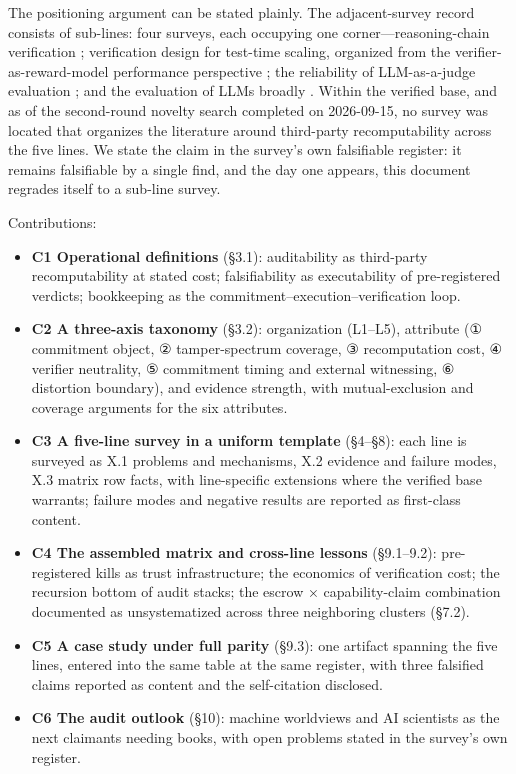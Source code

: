 \documentclass[11pt,a4paper]{article}
\begin{document}
The positioning argument can be stated plainly. The adjacent-survey record consists of sub-lines: four surveys, each occupying one corner—reasoning-chain verification \cite{key14}; verification design for test-time scaling, organized from the verifier-as-reward-model performance perspective \cite{key15}; the reliability of LLM-as-a-judge evaluation \cite{key16}; and the evaluation of LLMs broadly \cite{key17}. Within the verified base, and as of the second-round novelty search completed on 2026-09-15, no survey was located that organizes the literature around third-party recomputability across the five lines. We state the claim in the survey's own falsifiable register: it remains falsifiable by a single find, and the day one appears, this document regrades itself to a sub-line survey.

Contributions:

\begin{itemize}[leftmargin=1.6em]
\item \textbf{C1 Operational definitions} (§3.1): auditability as third-party recomputability at stated cost; falsifiability as executability of pre-registered verdicts; bookkeeping as the commitment–execution–verification loop.
\item \textbf{C2 A three-axis taxonomy} (§3.2): organization (L1–L5), attribute (① commitment object, ② tamper-spectrum coverage, ③ recomputation cost, ④ verifier neutrality, ⑤ commitment timing and external witnessing, ⑥ distortion boundary), and evidence strength, with mutual-exclusion and coverage arguments for the six attributes.
\item \textbf{C3 A five-line survey in a uniform template} (§4–§8): each line is surveyed as X.1 problems and mechanisms, X.2 evidence and failure modes, X.3 matrix row facts, with line-specific extensions where the verified base warrants; failure modes and negative results are reported as first-class content.
\item \textbf{C4 The assembled matrix and cross-line lessons} (§9.1–9.2): pre-registered kills as trust infrastructure; the economics of verification cost; the recursion bottom of audit stacks; the escrow × capability-claim combination documented as unsystematized across three neighboring clusters (§7.2).
\item \textbf{C5 A case study under full parity} (§9.3): one artifact spanning the five lines, entered into the same table at the same register, with three falsified claims reported as content and the self-citation disclosed.
\item \textbf{C6 The audit outlook} (§10): machine worldviews and AI scientists as the next claimants needing books, with open problems stated in the survey's own register.
\end{itemize}
\end{document}
